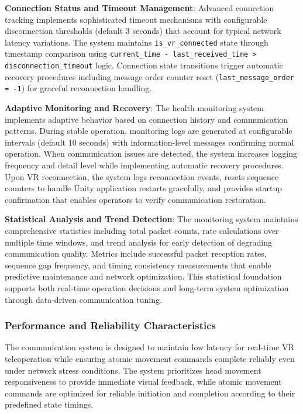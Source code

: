 \textbf{Connection Status and Timeout Management}: Advanced connection tracking implements sophisticated timeout mechanisms with configurable disconnection thresholds (default 3 seconds) that account for typical network latency variations. The system maintains \texttt{is\_vr\_connected} state through timestamp comparison using \texttt{current\_time - last\_received\_time > disconnection\_timeout} logic. Connection state transitions trigger automatic recovery procedures including message order counter reset (\texttt{last\_message\_order = -1}) for graceful reconnection handling.

\textbf{Adaptive Monitoring and Recovery}: The health monitoring system implements adaptive behavior based on connection history and communication patterns. During stable operation, monitoring logs are generated at configurable intervals (default 10 seconds) with information-level messages confirming normal operation. When communication issues are detected, the system increases logging frequency and detail level while implementing automatic recovery procedures. Upon VR reconnection, the system logs reconnection events, resets sequence counters to handle Unity application restarts gracefully, and provides startup confirmation that enables operators to verify communication restoration.

\textbf{Statistical Analysis and Trend Detection}: The monitoring system maintains comprehensive statistics including total packet counts, rate calculations over multiple time windows, and trend analysis for early detection of degrading communication quality. Metrics include successful packet reception rates, sequence gap frequency, and timing consistency measurements that enable predictive maintenance and network optimization. This statistical foundation supports both real-time operation decisions and long-term system optimization through data-driven communication tuning.

\subsubsection{Performance and Reliability Characteristics}
The communication system is designed to maintain low latency for real-time VR teleoperation while ensuring atomic movement commands complete reliably even under network stress conditions. The system prioritizes head movement responsiveness to provide immediate visual feedback, while atomic movement commands are optimized for reliable initiation and completion according to their predefined state timings. 

